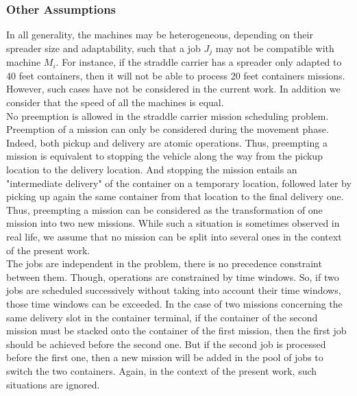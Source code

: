 \documentclass[a4paper,12pt]{article}
\begin{document}
\subsubsection{Other Assumptions}

In all generality, the machines may be heterogeneous, depending on their spreader size and adaptability, such that a job $J_j$ may not be compatible with machine $M_i$. For instance, if the straddle carrier has a spreader only adapted to 40 feet containers, then it will not be able to process 20 feet containers missions. However, such cases have not be considered in the current work. In addition we consider that the speed of all the machines is equal. \\

No preemption is allowed in the straddle carrier mission scheduling problem. Preemption of a mission can only be considered during the movement phase. Indeed, both pickup and delivery are atomic operations. Thus, preempting a mission is equivalent to stopping the vehicle along the way from the pickup location to the delivery location. And stopping the mission entails an "intermediate delivery" of the container on a temporary location, followed later by picking up again the same container from that location to the final delivery one. Thus, preempting a mission can be considered as the transformation of one mission into two new missions. While such a situation is sometimes observed in real life, we assume that no mission can be split into several ones in the context of the present work.\\

The jobs are independent in the problem, there is no precedence constraint between them. Though, operations are constrained by time windows. So, if two jobs are scheduled successively without taking into account their time windows, those time windows can be exceeded. In the case of two missions concerning the same delivery slot in the container terminal, if the container of the second mission must be stacked onto the container of the first mission, then the first job should be achieved before the second one. But if the second job is processed before the first one, then a new mission will be added in the pool of jobs to switch the two containers. Again, in the context of the present work, such situations are ignored. %
\end{document}
